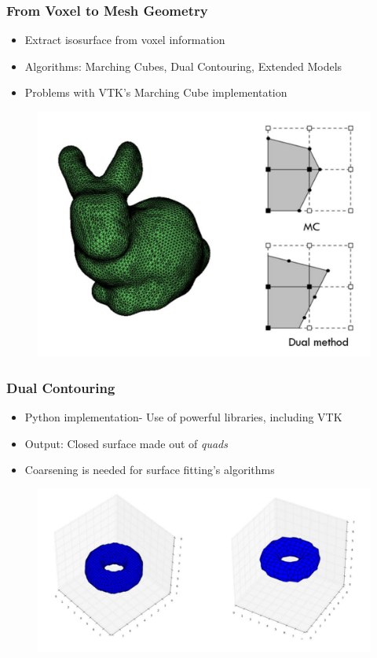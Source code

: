 \begin{frame}

	\frametitle{From Voxel to Mesh Geometry}
	
	\begin{itemize}
	\item Extract isosurface from voxel information
	\item Algorithms: Marching Cubes, Dual Contouring, Extended Models
	\item Problems with VTK's Marching Cube implementation
	\end{itemize}
	\begin{figure}
	\includegraphics[scale=0.35]{Pictures/bunny_MC.pdf}
	\end{figure}
	
\end{frame}

\begin{frame}

	\frametitle{Dual Contouring}
	
	\begin{itemize}
	\item Python implementation- Use of powerful libraries, including VTK
	\item Output: Closed surface made out of \textit{quads}
	\item Coarsening is needed for surface fitting's algorithms
	\end{itemize}
	\begin{figure}
	\includegraphics[scale=0.35]{Pictures/DC/sphere.pdf}
	\end{figure}
	
\end{frame}

